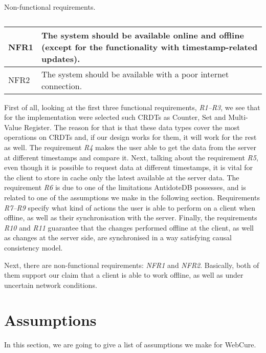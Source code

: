 \begin{table}[!htbp]
\centering
\caption{Non-functional requirements.}
\label{table:req2}
\begin{tabular}{|p{1cm}|p{14cm}|}
\hline
NFR1 & The system should be available online and offline (except for the functionality with timestamp-related updates). \\ \hline
NFR2 & The system should be available with a poor internet connection. \\ \hline
\end{tabular}
\caption*{}
\end{table} 

First of all, looking at the first three functional requirements, \textit{R1--R3}, we see that for the implementation were selected such CRDTs as Counter, Set and Multi-Value Register. The reason for that is that these data types cover the most operations on CRDTs and, if our design works for them, it will work for the rest as well. The requirement \textit{R4} makes the user able to get the data from the server at different timestamps and compare it. Next, talking about the requirement \textit{R5}, even though it is possible to request data at different timestamps, it is vital for the client to store in cache only the latest available at the server data. The requirement \textit{R6} is due to one of the limitations AntidoteDB possesses, and is related to one of the assumptions we make in the following section. Requirements \textit{R7--R9} specify what kind of actions the user is able to perform on a client when offline, as well as their synchronisation with the server. Finally, the requirements \textit{R10} and \textit{R11} guarantee that the changes performed offline at the client, as well as changes at the server side, are synchronised in a way satisfying causal consistency model. 

Next, there are non-functional requirements: \textit{NFR1} and \textit{NFR2}. Basically, both of them support our claim that a client is able to work offline, as well as under uncertain network conditions. 

\section{Assumptions}
\label{4-Assumptions}

In this section, we are going to give a list of assumptions we make for WebCure. 

